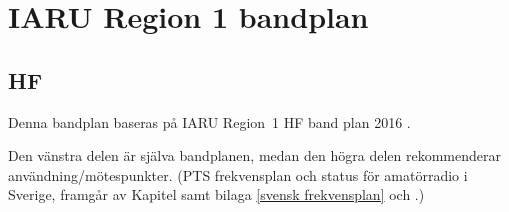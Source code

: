 \onecolumn

\chapter{IARU Region 1 bandplan}
\label{IARU bandplan}

\section{HF}
\label{HFbandplan}

Denna bandplan baseras på IARU Region~1 HF band plan 2016 \cite{IARU1}.

Den vänstra delen är själva bandplanen, medan den högra delen rekommenderar
användning/mötespunkter.
(PTS frekvensplan och status för amatörradio i Sverige, framgår av Kapitel
 samt bilaga \ref{svensk frekvensplan} och
.)

